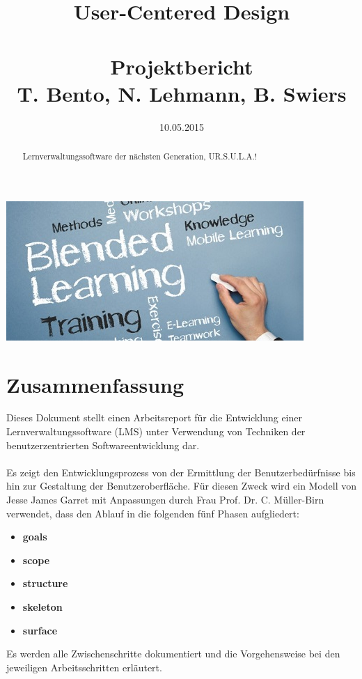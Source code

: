 \documentclass{article}
\title{User-Centered Design\\~\\Projektbericht\\ \small{T. Bento, N. Lehmann, B. Swiers}}
\date{10.05.2015}
\begin{document}
\renewcommand\abstractname{UR.S.U.L.A. (yoUR Study and Universial Learning Assistent)}
\maketitle
\includegraphics{img/title_pic.jpg}
\begin{abstract}
{\huge L}ernverwaltungssoftware der nächsten Generation, UR.S.U.L.A.!\\
\end{abstract}

\newpage

\tableofcontents

\newpage

\section{Zusammenfassung}

Dieses Dokument stellt einen Arbeitsreport für die Entwicklung einer Lernverwaltungssoftware (LMS) unter Verwendung von Techniken der benutzerzentrierten Softwareentwicklung dar.\\
\\
Es zeigt den Entwicklungsprozess von der Ermittlung der Benutzerbedürfnisse bis hin zur Gestaltung der Benutzeroberfläche. Für diesen Zweck wird ein Modell von Jesse James Garret mit Anpassungen durch Frau Prof. Dr. C. Müller-Birn verwendet, dass den Ablauf in die folgenden fünf Phasen aufgliedert:
\begin{itemize}
\item \textbf{goals}
\item \textbf{scope}
\item \textbf{structure}
\item \textbf{skeleton}
\item \textbf{surface}
\end{itemize}
Es werden alle Zwischenschritte dokumentiert und die Vorgehensweise bei den jeweiligen Arbeitsschritten erläutert.
\end{document}
